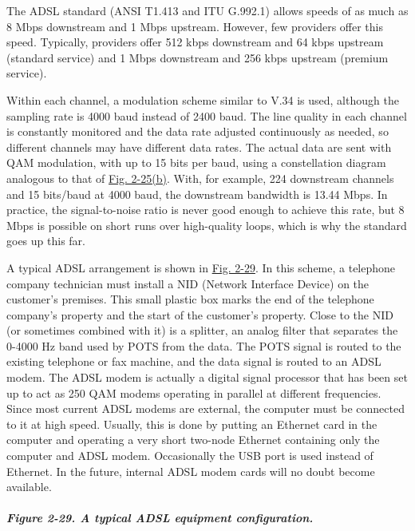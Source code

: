 The ADSL standard (ANSI T1.413 and ITU G.992.1) allows speeds of as much
as 8 Mbps downstream and 1 Mbps upstream. However, few providers offer
this speed. Typically, providers offer 512 kbps downstream and 64 kbps
upstream (standard service) and 1 Mbps downstream and 256 kbps upstream
(premium service).

Within each channel, a modulation scheme similar to V.34 is used,
although the sampling rate is 4000 baud instead of 2400 baud. The line
quality in each channel is constantly monitored and the data rate
adjusted continuously as needed, so different channels may have
different data rates. The actual data are sent with QAM modulation, with
up to 15 bits per baud, using a constellation diagram analogous to that
of
\protect\hyperlink{0130661023_ch02lev1sec5.htmlux5cux23ch02fig25}{Fig.
2-25(b)}. With, for example, 224 downstream channels and 15 bits/baud at
4000 baud, the downstream bandwidth is 13.44 Mbps. In practice, the
signal-to-noise ratio is never good enough to achieve this rate, but 8
Mbps is possible on short runs over high-quality loops, which is why the
standard goes up this far.

A typical ADSL arrangement is shown in
\protect\hyperlink{0130661023_ch02lev1sec5.htmlux5cux23ch02fig29}{Fig.
2-29}. In this scheme, a telephone company technician must install a
{NID} ({Network Interface Device}) on the customer's premises. This
small plastic box marks the end of the telephone company's property and
the start of the customer's property. Close to the NID (or sometimes
combined with it) is a {splitter}, an analog filter that separates the
0-4000 Hz band used by POTS from the data. The POTS signal is routed to
the existing telephone or fax machine, and the data signal is routed to
an ADSL modem. The ADSL modem is actually a digital signal processor
that has been set up to act as 250 QAM modems operating in parallel at
different frequencies. Since most current ADSL modems are external, the
computer must be connected to it at high speed. Usually, this is done by
putting an Ethernet card in the computer and operating a very short
two-node Ethernet containing only the computer and ADSL modem.
Occasionally the USB port is used instead of Ethernet. In the future,
internal ADSL modem cards will no doubt become available.

\subparagraph[Figure 2-29. A typical ADSL equipment
configuration.]{\texorpdfstring{\protect\hypertarget{0130661023_ch02lev1sec5.htmlux5cux23ch02fig29}{}{}Figure
2-29. A typical ADSL equipment
configuration.}{Figure 2-29. A typical ADSL equipment configuration.}}

